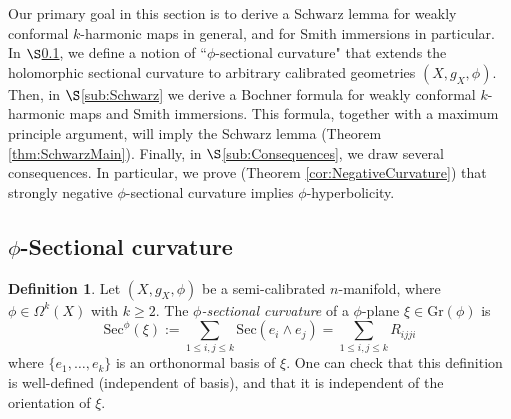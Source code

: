 \documentclass[11pt]{article}
\theoremstyle{definition}
\newtheorem{defn}[thm]{Definition}
\numberwithin{equation}{section}
\begin{document}
\indent \indent Our primary goal in this section is to derive a Schwarz lemma for weakly conformal $k$-harmonic maps in general, and for Smith immersions in particular.  In $\S$\ref{sub:PhiSec}, we define a notion of ``$\phi$-sectional curvature" that extends the holomorphic sectional curvature to arbitrary calibrated geometries $(X, g_X, \phi)$.  Then, in $\S$\ref{sub:Schwarz} we derive a Bochner formula for weakly conformal $k$-harmonic maps and Smith immersions.  This formula, together with a maximum principle argument, will imply the Schwarz lemma (Theorem \ref{thm:SchwarzMain}).  Finally, in $\S$\ref{sub:Consequences}, we draw several consequences.  In particular, we prove (Theorem \ref{cor:NegativeCurvature}) that strongly negative $\phi$-sectional curvature implies $\phi$-hyperbolicity.

\subsection{$\phi$-Sectional curvature} \label{sub:PhiSec}

\begin{defn} Let $(X, g_X, \phi)$ be a semi-calibrated $n$-manifold, where $\phi \in \Omega^k(X)$ with $k \geq 2$.  The \emph{$\phi$-sectional curvature} of a $\phi$-plane $\xi \in \mathrm{Gr}(\phi)$ is
$$\mathrm{Sec}^\phi(\xi) := \sum_{1 \leq i,j \leq k} \mathrm{Sec}(e_i \wedge e_j) = \sum_{1 \leq i,j \leq k} R_{ijji}$$
where $\{e_1, \ldots, e_k\}$ is an orthonormal basis of $\xi$.  One can check that this definition is well-defined (independent of basis), and that it is independent of the orientation of $\xi$.
\end{defn}
\end{document}

